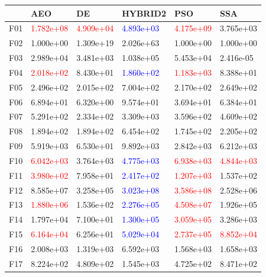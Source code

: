 \documentclass{article}
\begin{document}
\begin{table}[H]
	\centering
	\begin{tabular}{|l|lllll|}
		\hline
{} &        AEO &         DE &    HYBRID2 &        PSO &        SSA \\
\hline
F01  &  \textcolor{red}{1.782e+08} &  \textcolor{red}{4.909e+04} &  \textcolor{blue}{4.893e+03} &  \textcolor{red}{4.175e+09} &  3.765e+03 \\
F02  &  1.000e+00 &  1.309e+19 &  2.026e+63 &  1.000e+00 &  1.000e+00 \\
F03  &  2.989e+04 &  3.481e+03 &  1.038e+05 &  5.453e+04 &  2.416e-05 \\
F04  &  \textcolor{red}{2.018e+02} &  8.430e+01 &  \textcolor{blue}{1.860e+02} &  \textcolor{red}{1.183e+03} &  8.388e+01 \\
F05  &  2.496e+02 &  2.015e+02 &  7.004e+02 &  2.170e+02 &  2.649e+02 \\
F06  &  6.894e+01 &  6.320e+00 &  9.574e+01 &  3.694e+01 &  6.384e+01 \\
F07  &  5.291e+02 &  2.334e+02 &  3.309e+03 &  3.596e+02 &  4.609e+02 \\
F08  &  1.894e+02 &  1.894e+02 &  6.454e+02 &  1.745e+02 &  2.205e+02 \\
F09  &  5.919e+03 &  6.530e+01 &  9.892e+03 &  2.842e+03 &  6.212e+03 \\
F10  &  \textcolor{red}{6.042e+03} &  3.764e+03 &  \textcolor{blue}{4.775e+03} &  \textcolor{red}{6.938e+03} &  \textcolor{red}{4.844e+03} \\
F11  &  \textcolor{red}{3.980e+02} &  7.958e+01 &  \textcolor{blue}{2.417e+02} &  \textcolor{red}{1.207e+03} &  1.537e+02 \\
F12  &  8.585e+07 &  3.258e+05 &  \textcolor{blue}{3.023e+08} &  \textcolor{red}{3.586e+08} &  2.528e+06 \\
F13  &  \textcolor{red}{1.880e+06} &  1.536e+02 &  \textcolor{blue}{2.276e+05} &  \textcolor{red}{4.508e+07} &  1.926e+05 \\
F14  &  1.797e+04 &  7.100e+01 &  \textcolor{blue}{1.300e+05} &  \textcolor{red}{3.059e+05} &  3.286e+03 \\
F15  &  \textcolor{red}{6.164e+04} &  6.256e+01 &  \textcolor{blue}{5.029e+04} &  \textcolor{red}{2.737e+05} &  \textcolor{red}{8.852e+04} \\
F16  &  2.008e+03 &  1.319e+03 &  6.592e+03 &  1.568e+03 &  1.658e+03 \\
F17  &  8.224e+02 &  4.809e+02 &  1.545e+03 &  4.725e+02 &  8.471e+02 \\

\end{tabular}
\end{table}
\end{document}
